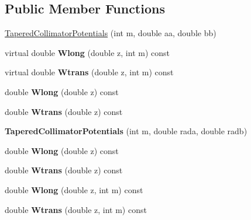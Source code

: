\subsection*{Public Member Functions}
\begin{DoxyCompactItemize}
\item 
\hyperlink{classTaperedCollimatorPotentials_a93bceeb8d67c5d1c20067dc372fb6098}{Tapered\+Collimator\+Potentials} (int m, double aa, double bb)
\item 
\mbox{\label{classTaperedCollimatorPotentials_a785259d651c30c35c229c0b4a1da5478}} 
virtual double {\bfseries Wlong} (double z, int m) const
\item 
\mbox{\label{classTaperedCollimatorPotentials_ad53d8a58197f7aba76059f72bf675ca4}} 
virtual double {\bfseries Wtrans} (double z, int m) const
\item 
\mbox{\label{classTaperedCollimatorPotentials_ac4b05037223ee2001b954b7f8cfd27c7}} 
double {\bfseries Wlong} (double z) const
\item 
\mbox{\label{classTaperedCollimatorPotentials_a1b20cea17327817157317f43a6eec69c}} 
double {\bfseries Wtrans} (double z) const
\item 
\mbox{\label{classTaperedCollimatorPotentials_a9e47632c7c35650f38ec3de4065bd359}} 
{\bfseries Tapered\+Collimator\+Potentials} (int m, double rada, double radb)
\item 
\mbox{\label{classTaperedCollimatorPotentials_ac4b05037223ee2001b954b7f8cfd27c7}} 
double {\bfseries Wlong} (double z) const
\item 
\mbox{\label{classTaperedCollimatorPotentials_a1b20cea17327817157317f43a6eec69c}} 
double {\bfseries Wtrans} (double z) const
\item 
\mbox{\label{classTaperedCollimatorPotentials_a785259d651c30c35c229c0b4a1da5478}} 
double {\bfseries Wlong} (double z, int m) const
\item 
\mbox{\label{classTaperedCollimatorPotentials_ad53d8a58197f7aba76059f72bf675ca4}} 
double {\bfseries Wtrans} (double z, int m) const
\end{DoxyCompactItemize}
